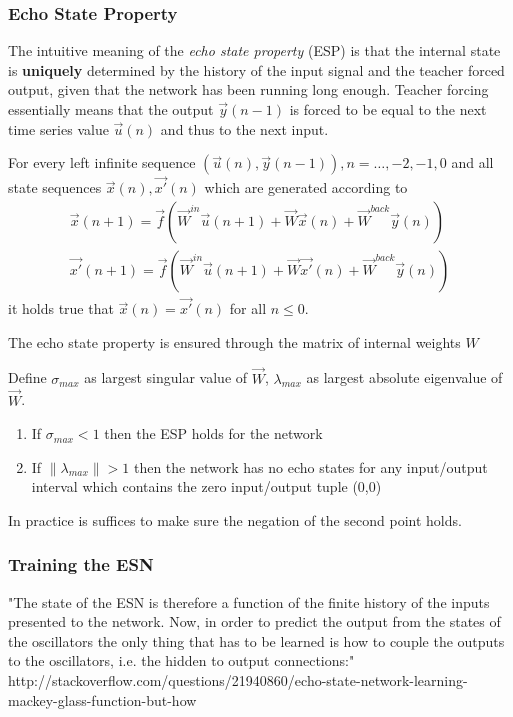 \subsubsection{Echo State Property}
The intuitive meaning of the \emph{echo state property} (ESP) is that the internal state is \textbf{uniquely} determined by the history of the input signal and the teacher forced output, given that the network has been running long enough. Teacher forcing essentially means that the output $\vec{y}(n-1)$ is forced to be equal to the next time series value $\vec{u}(n)$ and thus to the next input.
\begin{frm-def}
For every left infinite sequence $(\vec{u}(n),\vec{y}(n-1)),n=\dots,-2,-1,0$ and all state sequences $\vec{x}(n),\vec{x'}(n)$ which are generated according to
\begin{align*}	
	\vec{x}(n+1)=\vec{f}(\vec{W}^{in}\vec{u}(n+1)+\vec{W}\vec{x}(n)+\vec{W}^{back}\vec{y}(n))\\
	\vec{x'}(n+1)=\vec{f}(\vec{W}^{in}\vec{u}(n+1)+\vec{W}\vec{x'}(n)+\vec{W}^{back}\vec{y}(n))
\end{align*}
it holds true that $\vec{x}(n)=\vec{x'}(n)$ for all $n \leq 0$.
\end{frm-def}
The echo state property is ensured through the matrix of internal weights $W$

\begin{frm-thm}
Define $\sigma_{max}$ as largest singular value of $\vec{W}$, $\lambda_{max}$ as largest absolute eigenvalue of $\vec{W}$.
\begin{enumerate}
\item If $\sigma_{max} < 1$ then the ESP holds for the network
\item If $\|\lambda_{max}\| > 1$ then the network has no echo states for any input/output interval which contains the zero input/output tuple (0,0)
\end{enumerate}
\end{frm-thm}
In practice is suffices to make sure the negation of the second point holds. 

\subsubsection*{Training the ESN}
"The state of the ESN is therefore a function of the finite history of the inputs presented to the network. Now, in order to predict the output from the states of the oscillators the only thing that has to be learned is how to couple the outputs to the oscillators, i.e. the hidden to output connections:"
http://stackoverflow.com/questions/21940860/echo-state-network-learning-mackey-glass-function-but-how


